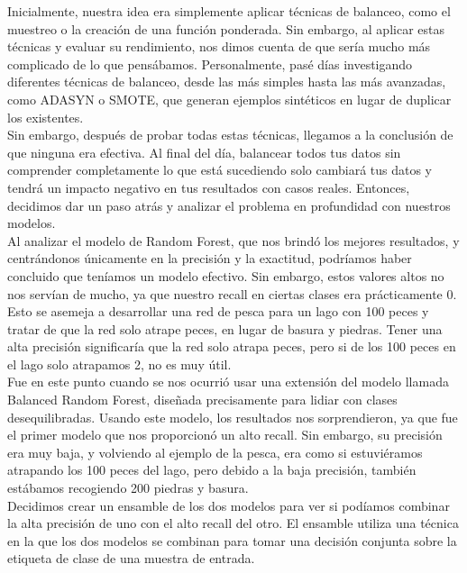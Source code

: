 \documentclass{article}
\begin{document}
Inicialmente, nuestra idea era simplemente aplicar técnicas de balanceo, como el muestreo o la creación de una función ponderada.
 Sin embargo, al aplicar estas técnicas y evaluar su rendimiento, nos dimos cuenta de que sería mucho más complicado de lo que
  pensábamos. Personalmente, pasé días investigando diferentes técnicas de balanceo, desde las más simples hasta las más avanzadas,
   como ADASYN o SMOTE, que generan ejemplos sintéticos en lugar de duplicar los existentes.\\

Sin embargo, después de probar todas estas técnicas, llegamos a la conclusión de que ninguna era efectiva. Al final del día, 
balancear todos tus datos sin comprender completamente lo que está sucediendo solo cambiará tus datos y tendrá un impacto 
negativo en tus resultados con casos reales. Entonces, decidimos dar un paso atrás y analizar el problema en profundidad con nuestros
 modelos.\\

Al analizar el modelo de Random Forest, que nos brindó los mejores resultados, y centrándonos únicamente en la 
precisión y la exactitud, podríamos haber concluido que teníamos un modelo efectivo. Sin embargo, estos valores altos no 
nos servían de mucho, ya que nuestro recall en ciertas clases era prácticamente 0. Esto se asemeja a desarrollar una red de 
pesca para un lago con 100 peces y tratar de que la red solo atrape peces, en lugar de basura y piedras. Tener una alta precisión 
significaría que la red solo atrapa peces, pero si de los 100 peces en el lago solo atrapamos 2, no es muy útil.\\

Fue en este punto cuando se nos ocurrió usar una extensión del modelo llamada Balanced Random Forest, diseñada precisamente
 para lidiar con clases desequilibradas. Usando este modelo, los resultados nos sorprendieron, ya que fue el primer modelo 
 que nos proporcionó un alto recall. Sin embargo, su precisión era muy baja, y volviendo al ejemplo de la pesca, era como si
  estuviéramos atrapando los 100 peces del lago, pero debido a la baja precisión, también estábamos recogiendo 200 piedras y basura.\\

Decidimos crear un ensamble de los dos modelos para ver si podíamos combinar la alta precisión de uno con el alto recall 
del otro. El ensamble utiliza una técnica en la que los dos modelos se combinan para tomar una decisión conjunta sobre la etiqueta
 de clase de una muestra de entrada.\\
\end{document}
